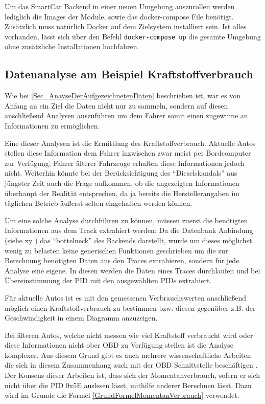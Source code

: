 Um das SmartCar Backend in einer neuen Umgebung auszurollen werden lediglich die Images der Module, sowie das docker-compose File benötigt. Zusätzlich muss natürlich Docker auf dem Zielsystem installiert sein. Ist alles vorhanden, lässt sich über den Befehl \texttt{docker-compose up} die gesamte Umgebung ohne zusätzliche Installationen hochfahren.

\subsection{Datenanalyse am Beispiel Kraftstoffverbrauch}
Wie bei \ref{Sec_AnayseDerAufgezeichnetenDaten} beschrieben ist, war es von Anfang an ein Ziel die Daten nicht nur zu sammeln, sondern auf diesen anschließend Analysen auszuführen um dem Fahrer somit einen zugewinne an Informationen zu ermöglichen. 

Eine dieser Analysen ist die Ermittlung des Kraftstoffverbrauch. Aktuelle Autos stellen diese Information dem Fahrer inzwischen zwar meist per Bordcomputer zur Verfügung, Fahrer älterer Fahrzeuge erhalten diese Informationen jedoch nicht. Weiterhin könnte bei der Berücksichtigung des \enquote{Dieselskandals} aus jüngster Zeit auch die Frage aufkommen, ob die angezeigten Informationen überhaupt der Realität entsprechen, da ja bereits die Herstellerangaben im täglichen Betrieb äußerst selten eingehalten werden können.

Um eine solche Analyse durchführen zu können, müssen zuerst die benötigten Informationen aus dem Track extrahiert werden:\newline
Da die Datenbank Anbindung (siehe xy ) das \enquote{bottelneck} des Backends darstellt, wurde um dieses möglichst wenig zu belasten keine generischen Funktionen geschrieben um die zur Berechnung benötigten Daten aus den Traces extrahieren, sondern für jede Analyse eine eigene. In diesen werden die Daten eines Traces durchlaufen und bei Übereinstimmung der \acs{PID} mit den ausgewählten \acp{PID} extrahiert.

Für aktuelle Autos ist es mit den gemessenen Verbrauchswerten anschließend möglich einen Kraftstoffverbrauch zu bestimmen bzw. diesen gegenüber z.B. der Geschwindigkeit in einem Diagramm anzuzeigen.

Bei älteren Autos, welche nicht messen wie viel Kraftstoff verbraucht wird oder diese Informationen nicht ober \ac{OBD} zu Verfügung stellen ist die Analyse komplexer. Aus diesem Grund gibt es auch mehrere wissenschaftliche Arbeiten die sich in diesem Zusammenhang auch mit der \ac{OBD} Schnittstelle beschäftigen . Der Konsens dieser Arbeiten ist, dass sich der Momentanverbrauch, sofern er sich nicht über die \ac{PID} 0x5E auslesen lässt, mithilfe anderer Berechnen lässt.
Dazu wird im Grunde die Formel \ref{GrundFormelMomentanVerbrauch} verwendet. 

